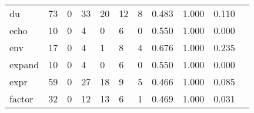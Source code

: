 \begin{longtable}{lp{1.2cm}p{1.2cm}p{1.2cm}p{1.2cm}p{1.2cm}p{1.2cm}p{1.2cm}p{1.2cm}p{1.2cm}p{1.2cm}}
du        &                                    73 &                                                  0 &                                                 33 &                                                 20 &                                                 12 &                                                  8 &                                              0.483 &                                              1.000 &                                              0.110 \\
echo      &                                    10 &                                                  0 &                                                  4 &                                                  0 &                                                  6 &                                                  0 &                                              0.550 &                                              1.000 &                                              0.000 \\
env       &                                    17 &                                                  0 &                                                  4 &                                                  1 &                                                  8 &                                                  4 &                                              0.676 &                                              1.000 &                                              0.235 \\
expand    &                                    10 &                                                  0 &                                                  4 &                                                  0 &                                                  6 &                                                  0 &                                              0.550 &                                              1.000 &                                              0.000 \\
expr      &                                    59 &                                                  0 &                                                 27 &                                                 18 &                                                  9 &                                                  5 &                                              0.466 &                                              1.000 &                                              0.085 \\
factor    &                                    32 &                                                  0 &                                                 12 &                                                 13 &                                                  6 &                                                  1 &                                              0.469 &                                              1.000 &                                              0.031 \\

\end{longtable}
